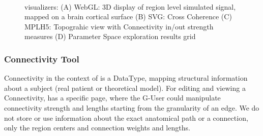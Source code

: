  \begin{figure}
	\qquad
	\\
	\qquad
	\caption{\TVB visualizers: 
	(A) WebGL: 3D display of region level simulated signal, mapped on a brain cortical surface
	(B) SVG: Cross Coherence
	(C) MPLH5:  Topograhic view with Connectivity in/out strength measures
	(D) Parameter Space exploration results grid}
        \label{fig:viewers}
\end{figure}

	\subsubsection{Connectivity Tool}

Connectivity in the context of \TVB is a DataType, mapping structural information about a subject (real patient or theoretical model).
For editing and viewing a Connectivity, \TVB has a specific page, where the G-User could manipulate connectivity strength and lengths 
starting from the granularity of an edge.
We do not store or use information about the exact anatomical path or a connection, only the region centers and connection weights and lengths.

